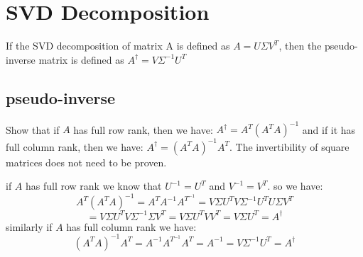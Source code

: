 \section{SVD Decomposition}
If the SVD decomposition of matrix A is defined as $A = U\Sigma  V^T$, then the pseudo-inverse
matrix is defined as $A ^{\dag} = V\Sigma ^{-1} U^T$
\subsection{pseudo-inverse}
Show that if $A$ has full row rank, then we have: $A^{\dag} = A^T(A^TA)^{-1}$ and if it has full column rank, then we have: $A^{\dag} = (A^TA)^{-1}A^T$. The invertibility of square matrices does not need to be proven.
\begin{qsolve}
	\begin{qsolve}[]
		if $A$ has full row rank we know that $U^{-1} = U^T$ and $V^{-1} = V^T$. so we have:
		$$A^T(A^TA)^{-1} = A^T A^{-1} A^{T^{-1}} = V \Sigma U^T V \Sigma^{-1} U^T U \Sigma V^T $$
		$$= V \Sigma U^T V \Sigma^{-1} \Sigma V^T = V \Sigma U^T V V^T = V \Sigma U^T = A^{\dag}$$
		similarly if $A$ has full column rank we have:
		$$(A^TA)^{-1}A^T = A^{-1} A^{T^{-1}} A^T = A^{-1} = V \Sigma^{-1} U^T = A^{\dag}$$
	\end{qsolve}
\end{qsolve}
